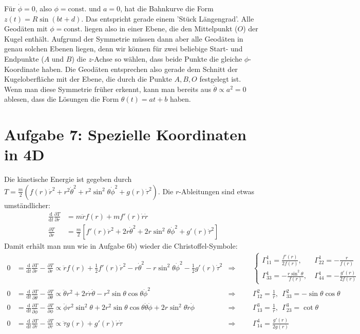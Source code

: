 \documentclass[a4paper,12pt]{article}
\newcommand{\kla}{}
\newcommand{\klam}{}
\newcommand{\tecxt}{}
\begin{document}
Für $\dot{\phi}=0$, also $\phi=\tecxt\text{const.}$ und $a=0$, hat die Bahnkurve die Form $z(t)=R\sin(bt+d)$. Das entspricht gerade einem 'Stück Längengrad'. Alle Geodäten mit $\phi=\tecxt\text{const.}$ liegen also in einer Ebene, die den Mittelpunkt ($O$) der Kugel enthält. Aufgrund der Symmetrie müssen dann aber alle Geodäten in genau solchen Ebenen liegen, denn wir können für zwei beliebige Start- und Endpunkte ($A$ und $B$) die $z$-Achse so wählen, dass beide Punkte die gleiche $\phi$-Koordinate haben. Die Geodäten entsprechen also gerade dem Schnitt der Kugeloberfläche mit der Ebene, die durch die Punkte $A,B,O$ festgelegt ist.\\
Wenn man diese Symmetrie früher erkennt, kann man bereits aus $\ddot{\theta}\propto a^2=0$ ablesen, dass die Lösungen die Form $\theta(t)=at+b$ haben.\newpage
\section*{Aufgabe 7: Spezielle Koordinaten in 4D}
Die kinetische Energie ist gegeben durch $T=\frac{m}{2}\kla\left( {f(r)\dot{r}^2+r^2\dot{\theta}^2+r^2\sin^2\theta\dot{\phi}^2+g(r)\dot{\tau}^2} \right)$. Die $r$-Ableitungen sind etwas umständlicher:
\begin{align*}
\frac{\tecxt\text{d}}{\tecxt\text{d}t}\frac{\partial T}{\partial\dot{r}}&=m \ddot{r}f(r)+mf'(r)\dot{r}\dot{r}\\
\frac{\partial T}{\partial r}&=\frac{m}{2}\klam\left[ {f'(r)\dot{r}^2+2r\dot{\theta}^2+2r\sin^2\theta\dot{\phi}^2+g'(r)\dot{\tau}^2} \right] 
\end{align*}
Damit erhält man nun wie in Aufgabe 6b) wieder die Christoffel-Symbole:
\begin{align*}
0&=\frac{\tecxt\text{d}}{\tecxt\text{d}t}\frac{\partial T}{\partial\dot{r}}-\frac{\partial T}{\partial r}\propto \ddot{r}f(r)+\frac{1}{2}f'(r)\dot{r}^2-r\dot{\theta}^2-r\sin^2\theta\dot{\phi}^2-\frac{1}{2}g'(r)\dot{\tau}^2&\Rightarrow &&& \left\{\begin{matrix}
\Gamma^1_{11}=\frac{f'(r)}{2f(r)},\ & \Gamma^1_{22}=-\frac{r}{f(r)}\\
\Gamma^1_{33}=-\frac{r\sin^2\theta}{f(r)},\ & \Gamma^1_{44}=-\frac{g'(r)}{2f(r)}
\end{matrix}\right. \\
0&=\frac{\tecxt\text{d}}{\tecxt\text{d}t}\frac{\partial T}{\partial\dot{\theta}}-\frac{\partial T}{\partial \theta}\propto \ddot{\theta}r^2+2r\dot{r}\dot{\theta}-r^2\sin\theta\cos\theta\dot{\phi}^2&\Rightarrow &&&\Gamma^2_{12}=\frac{1}{r},\ \ \Gamma^2_{33}=-\sin\theta\cos\theta\\
0&=\frac{\tecxt\text{d}}{\tecxt\text{d}t}\frac{\partial T}{\partial\dot{\phi}}-\frac{\partial T}{\partial \phi}\propto \ddot{\phi}r^2\sin^2\theta+2r^2\sin\theta\cos\theta\dot{\theta}\dot{\phi}+2r\sin^2\theta\dot{r}\dot{\phi}&\Rightarrow &&&\Gamma^3_{13}=\frac{1}{r},\ \ \Gamma^3_{23}=\cot\theta\\
0&=\frac{\tecxt\text{d}}{\tecxt\text{d}t}\frac{\partial T}{\partial\dot{\tau}}-\frac{\partial T}{\partial \tau}\propto \ddot{\tau}g(r)+g'(r)\dot{r}\dot{\tau}&\Rightarrow &&&\Gamma^4_{14}=\frac{g'(r)}{2g(r)}
\end{align*}
\end{document}
